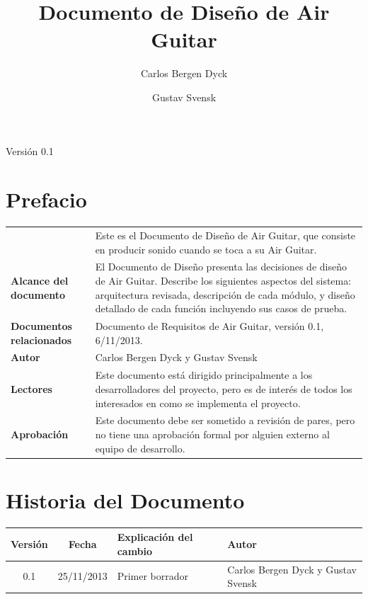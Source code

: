 \documentclass[a4paper,12pt]{article}
\title{Documento de Diseño de Air Guitar}
\author{Carlos Bergen Dyck \and Gustav Svensk}
\begin{document}
\renewcommand{\arraystretch}{1.5}
\maketitle
\begin{center}
        {\large Versión 0.1}
\end{center}
\newpage


\section{Prefacio}
\begin{tabular}{p{3cm} p{12cm}}
        & Este es el Documento de Diseño de Air Guitar, que consiste en
        producir sonido cuando se toca a su Air Guitar. \\
        \textbf{Alcance del documento} & El Documento de Diseño presenta las
        decisiones de diseño de Air Guitar. Describe los siguientes aspectos del
        sistema: arquitectura revisada, descripción de cada módulo, y diseño
        detallado de cada función incluyendo sus casos de prueba.\\
        \textbf{Documentos relacionados} & Documento de Requisitos de Air Guitar,
        versión 0.1, 6/11/2013. \\
        \textbf{Autor} & Carlos Bergen Dyck y Gustav Svensk \\
        \textbf{Lectores} & Este documento está dirigido principalmente a los
        desarrolladores del proyecto, pero es de interés de todos los
        interesados en como se implementa el proyecto. \\
        \textbf{Aprobación} & Este documento debe ser sometido a revisión de
        pares, pero no tiene una aprobación formal por alguien externo al equipo
        de desarrollo.
\end{tabular}

\section{Historia del Documento}
\begin{tabular}{|c|c|p{6cm}|p{4cm}|}
        \hline
        \textbf{Versión} & \textbf{Fecha} & \textbf{Explicación del cambio} &
        \textbf{Autor} \\ \hline
        0.1 & 25/11/2013 & Primer borrador & Carlos Bergen Dyck y Gustav Svensk \\
        \hline
\end{tabular}
\end{document}
